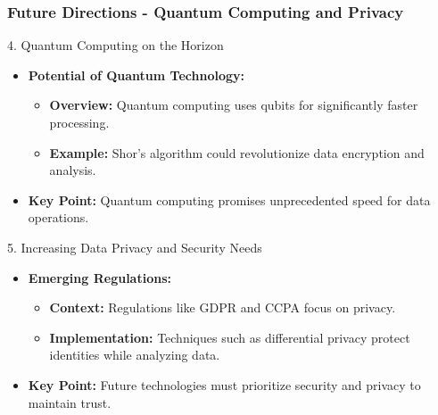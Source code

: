 \documentclass[aspectratio=169]{beamer}
\begin{document}
\begin{frame}[fragile]
    \frametitle{Future Directions - Quantum Computing and Privacy}
    \begin{block}{4. Quantum Computing on the Horizon}
        \begin{itemize}
            \item \textbf{Potential of Quantum Technology:}
                \begin{itemize}
                    \item \textbf{Overview:} Quantum computing uses qubits for significantly faster processing.
                    \item \textbf{Example:} Shor's algorithm could revolutionize data encryption and analysis.
                \end{itemize}
            \item \textbf{Key Point:} Quantum computing promises unprecedented speed for data operations.
        \end{itemize}
    \end{block}

    \begin{block}{5. Increasing Data Privacy and Security Needs}
        \begin{itemize}
            \item \textbf{Emerging Regulations:}
                \begin{itemize}
                    \item \textbf{Context:} Regulations like GDPR and CCPA focus on privacy.
                    \item \textbf{Implementation:} Techniques such as differential privacy protect identities while analyzing data.
                \end{itemize}
            \item \textbf{Key Point:} Future technologies must prioritize security and privacy to maintain trust.
        \end{itemize}
    \end{block}
\end{frame}
\end{document}
